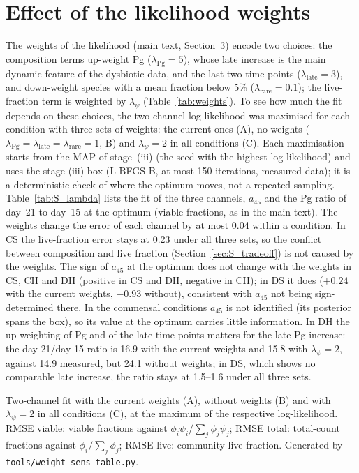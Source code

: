 \documentclass[11pt,a4paper]{article}
\newcommand{\TBD}[1]{\textcolor{red}{\textbf{[#1]}}}
\begin{document}
\section{Effect of the likelihood weights}
\label{sec:S_lambda}
The weights of the likelihood (main text, Section~3) encode two choices: the composition terms up-weight Pg ($\lambda_{\mathrm{Pg}}=5$), whose late increase is the main dynamic feature of the dysbiotic data, and the last two time points ($\lambda_{\mathrm{late}}=3$), and down-weight species with a mean fraction below 5\% ($\lambda_{\mathrm{rare}}=0.1$); the live-fraction term is weighted by $\lambda_\psi$ (Table~\ref{tab:weights}).
To see how much the fit depends on these choices, the two-channel log-likelihood was maximised for each condition with three sets of weights: the current ones (A), no weights ($\lambda_{\mathrm{Pg}}=\lambda_{\mathrm{late}}=\lambda_{\mathrm{rare}}=1$, B) and $\lambda_\psi=2$ in all conditions (C).
Each maximisation starts from the MAP of stage~(iii) (the seed with the highest log-likelihood) and uses the stage-(iii) box (L-BFGS-B, at most 150 iterations, measured data); it is a deterministic check of where the optimum moves, not a repeated sampling.
Table~\ref{tab:S_lambda} lists the fit of the three channels, $a_{45}$ and the Pg ratio of day~21 to day~15 at the optimum (viable fractions, as in the main text).
The weights change the error of each channel by at most 0.04 within a condition.
In CS the live-fraction error stays at 0.23 under all three sets, so the conflict between composition and live fraction (Section~\ref{sec:S_tradeoff}) is not caused by the weights.
The sign of $a_{45}$ at the optimum does not change with the weights in CS, CH and DH (positive in CS and DH, negative in CH); in DS it does ($+0.24$ with the current weights, $-0.93$ without), consistent with $a_{45}$ not being sign-determined there. In the commensal conditions $a_{45}$ is not identified (its posterior spans the box), so its value at the optimum carries little information.
In DH the up-weighting of Pg and of the late time points matters for the late Pg increase: the day-21/day-15 ratio is 16.9 with the current weights and 15.8 with $\lambda_\psi=2$, against 14.9 measured, but 24.1 without weights; in DS, which shows no comparable late increase, the ratio stays at 1.5--1.6 under all three sets.

\begin{table}[h]
\centering
\caption{Two-channel fit with the current weights (A), without weights (B) and with $\lambda_\psi=2$ in all conditions (C), at the maximum of the respective log-likelihood. RMSE viable: viable fractions against $\phi_i\psi_i/\sum_j\phi_j\psi_j$; RMSE total: total-count fractions against $\phi_i/\sum_j\phi_j$; RMSE live: community live fraction. Generated by \texttt{tools/weight\_sens\_table.py}.}
\label{tab:S_lambda}
\small\setlength{\tabcolsep}{4pt}
\IfFileExists{figures/raw/supp/supp_S_lambda2c.tex}{}{\TBD{table pending}}
\end{table}
\end{document}
